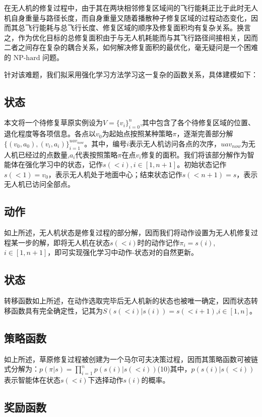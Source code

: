 \documentclass[AutoFakeBold]{LZUThesis}
\begin{document}
在无人机的修复过程中，由于其在两块相邻修复区域间的飞行能耗正比于此时无人机自身重量与路径长度，而自身重量又随着播散种子修复区域的过程动态变化，因而其总飞行能耗与总飞行长度、修复区域的顺序及修复面积均有复杂关系。换言之，作为优化目标的总修复面积由于与无人机耗能而与其飞行路径间接相关，因而二者之间存在复杂的耦合关系，如何解决修复面积的最优化，毫无疑问是一个困难的 $\text{NP-hard}$ 问题。

针对该难题，我们拟采用强化学习方法学习这一复杂的函数关系，具体建模如下：

\subsection{状态}

本文将一个待修复草原实例设为$V=\{v_i\}_{i=0}^n$,其中包含了各个待修复区域的位置、退化程度等各项信息。各点以$v_0$为起始点按照某种策略$\pi$，逐渐完善部分解$\{(v_0,a_0),(v_i,a_i)\}_{i=1}^{uav_{now}}$。其中，编号$i$表示无人机访问各点的次序，$uav_{now}$为无人机已经过的点数量,$a_i$代表按照策略$\pi$在点$v_i$修复的面积。我们将该部分解作为智能体在强化学习中的状态，记作$s(<i),i\in[1,n+1]$。初始状态记作$s(<1)=v_0$，表示无人机处于地面中心；结束状态记作$s(<n+1)=s$，表示无人机已访问全部点。

\subsection{动作}

如上所述，无人机状态是修复过程的部分解，因而我们将动作设置为无人机修复过程某一步的解，即将无人机在状态$s(<i)$时的动作记作$\pi_i=s(i)$,$i\in[1,n+1]$，即可实现强化学习中动作-状态对的自然更新。

\subsection{状态}

转移函数如上所述，在动作选取完毕后无人机新的状态也被唯一确定，因而状态转移函数具有完全确定性，记其为$S(s(<i)|s(i))=s(<i+1)$,$i\in[1,n]$。

\subsection{策略函数}

如上所述，草原修复过程被创建为一个马尔可夫决策过程，因而其策略函数可被链式分解为：$p(\pi|s)=\prod_{i=1}^n p(s(i)|s(<i))$(10)其中，$p(s(i)|s(<i))$表示智能体在状态$s(<i)$下选择动作$s(i)$的概率。

\subsection{奖励函数}
\end{document}
